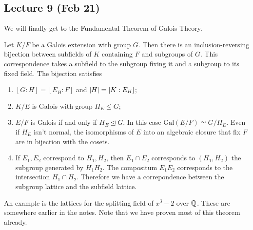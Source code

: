 \documentclass[10pt, twoside]{article}
\begin{document}
    \subsection{Lecture 9 (Feb 21)}%
    
    We will finally get to the Fundamental Theorem of Galois Theory.

    \begin{thm}
        Let $K/F$ be a Galois extension with group $G$. Then there is an inclusion-reversing bijection between subfields of $K$ containing $F$ and subgroups of $G$. This correspondence takes a subfield to the subgroup fixing it and a subgroup to its fixed field. The bijection satisfies
        \begin{enumerate}[label=(\alph*)]
            \item $[G:H] = [E_H:F]$ and $\lvert H\rvert = [K:E_H]$;
            \item $K/E$ is Galois with group $H_E \leq G$;
            \item $E/F$ is Galois if and only if $H_E \trianglelefteq G$. In this case $\mathrm{Gal}(E/F) \simeq G/H_E$. Even if $H_E$ isn't normal, the isomorphisms of $E$ into an algebraic closure that fix $F$ are in bijection with the cosets.
            \item If $E_1, E_2$ correspond to $H_1,H_2$, then $E_1 \cap E_2$ corresponds to $(H_1, H_2)$ the subgroup generated by $H_1H_2$. The compositum $E_1E_2$ corresponds to the intersection $H_1 \cap H_2$. Therefore we have a correpondence between the subgroup lattice and the subfield lattice.
        \end{enumerate}
    \end{thm}

    An example is the lattices for the splitting field of $x^3-2$ over $\mathbb{Q}$. These are somewhere earlier in the notes. Note that we have proven most of this theorem already.
\end{document}
